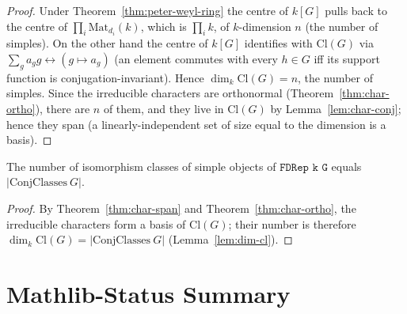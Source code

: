 \begin{proof}
  Under Theorem~\ref{thm:peter-weyl-ring} the centre of $k[G]$ pulls back to
  the centre of $\prod_i \mathrm{Mat}_{d_i}(k)$, which is $\prod_i k$, of
  $k$-dimension $n$ (the number of simples). On the other hand the centre
  of $k[G]$ identifies with $\mathrm{Cl}(G)$ via
  $\sum_g a_g g \leftrightarrow (g \mapsto a_g)$ (an element commutes with
  every $h \in G$ iff its support function is conjugation-invariant). Hence
  $\dim_k \mathrm{Cl}(G) = n$, the number of simples. Since the irreducible
  characters are orthonormal (Theorem~\ref{thm:char-ortho}), there are
  $n$ of them, and they live in $\mathrm{Cl}(G)$ by Lemma~\ref{lem:char-conj};
  hence they span (a linearly-independent set of size equal to the dimension
  is a basis).
\end{proof}

\begin{theorem}[Number of irreducibles = number of conjugacy classes]
  \label{thm:num-irreps}
  The number of isomorphism classes of simple objects of $\texttt{FDRep k G}$
  equals $|\mathrm{ConjClasses}\ G|$.
\end{theorem}

\begin{proof}
  By Theorem~\ref{thm:char-span} and Theorem~\ref{thm:char-ortho}, the
  irreducible characters form a basis of $\mathrm{Cl}(G)$; their number
  is therefore $\dim_k\mathrm{Cl}(G) = |\mathrm{ConjClasses}\ G|$
  (Lemma~\ref{lem:dim-cl}).
\end{proof}


\chapter{Mathlib-Status Summary}
\label{chap:status}

